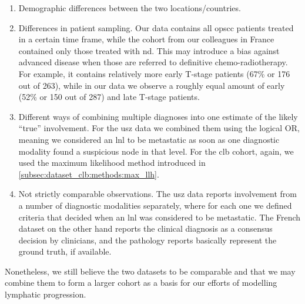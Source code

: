 \documentclass[\relativeRoot/main.tex]{subfiles}
\begin{document}
\begin{enumerate}
    \item Demographic differences between the two locations/countries.
    \item Differences in patient sampling. Our data contains all \gls{opscc} patients treated in a certain time frame, while the cohort from our colleagues in France contained only those treated with \acrlong{nd}. This may introduce a bias against advanced disease when those are referred to definitive chemo-radiotherapy. For example, it contains relatively more early T-stage patients (67\% or 176 out of 263), while in our data we observe a roughly equal amount of early (52\% or 150 out of 287) and late T-stage patients.
    \item Different ways of combining multiple diagnoses into one estimate of the likely ``true'' involvement. For the \gls{usz} data we combined them using the logical OR, meaning we considered an \gls{lnl} to be metastatic as soon as one diagnostic modality found a suspicious node in that level. For the \gls{clb} cohort, again, we used the maximum likelihood method introduced in \cref{subsec:dataset_clb:methods:max_llh}.
    \item Not strictly comparable observations. The \gls{usz} data reports involvement from a number of diagnostic modalities separately, where for each one we defined criteria that decided when an \gls{lnl} was considered to be metastatic. The French dataset on the other hand reports the clinical diagnosis as a consensus decision by clinicians, and the pathology reports basically represent the ground truth, if available.
\end{enumerate}

Nonetheless, we still believe the two datasets to be comparable and that we may combine them to form a larger cohort as a basis for our efforts of modelling lymphatic progression. 
\end{document}
